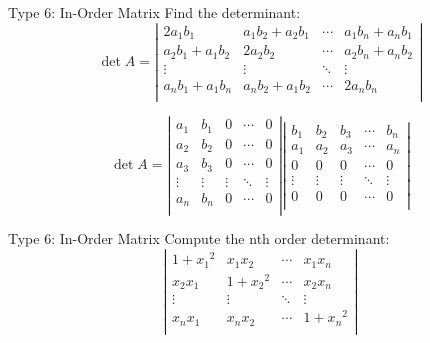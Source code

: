 \documentclass{beamer}
\begin{document}
\begin{frame}{Type 6: In-Order Matrix}
Find the determinant:
\begin{equation*}
    \det A=\left| \begin{matrix}
        2a_1b_1&		a_1b_2+a_2b_1&		\cdots&		a_1b_n+a_nb_1\\
        a_2b_1+a_1b_2&		2a_2b_2&		\cdots&		a_2b_n+a_nb_2\\
        \vdots&		\vdots&		\ddots&		\vdots\\
        a_nb_1+a_1b_n&		a_nb_2+a_1b_2&		\cdots&		2a_nb_n\\
    \end{matrix} \right|
\end{equation*}

\begin{equation*}
    \det A=\left| \begin{matrix}
        a_1&		b_1&		0&		\cdots&		0\\
        a_2&		b_2&		0&		\cdots&		0\\
        a_3&		b_3&		0&		\cdots&		0\\
        \vdots&		\vdots&		\vdots&		\ddots&		\vdots\\
        a_n&		b_n&		0&		\cdots&		0\\
    \end{matrix} \right|\left| \begin{matrix}
        b_1&		b_2&		b_3&		\cdots&		b_n\\
        a_1&		a_2&		a_3&		\cdots&		a_n\\
        0&		0&		0&		\cdots&		0\\
        \vdots&		\vdots&		\vdots&		\ddots&		\vdots\\
        0&		0&		0&		\cdots&		0\\
    \end{matrix} \right|
\end{equation*}
\end{frame}

\begin{frame}{Type 6: In-Order Matrix}
    Compute the nth order determinant:
    \begin{equation*}
    \left| \begin{matrix}
        1+{x_1}^2&		x_1x_2&		\cdots&		x_1x_n\\
        x_2x_1&		1+{x_2}^2&		\cdots&		x_2x_n\\
        \vdots&		\vdots&		\ddots&		\vdots\\
        x_nx_1&		x_nx_2&		\cdots&		1+{x_n}^2\\
    \end{matrix} \right|
    \end{equation*}
\end{frame}
\end{document}
